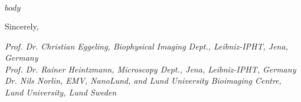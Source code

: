 \documentclass[$size$]{letter}
\newcommand{\header}[9]{
    {\hypersetup{hidelinks}
    \noindent
    \parbox[b][0.625in][t]{6.5in}{
        \vspace{-0.375in}
        \parbox[b][0.625in][t]{3.74in}
            {\href{http://www.umich.edu}
            {\texttt{[image: ./IPHTLogo.pdf]}}}\hfill
        \parbox[b][0.625in][t]{2in}{
            \setlength{\baselineskip}{9pt}
            \fontsize{7pt}{7pt}{
                \fontspec{TeX Gyre Heros}
                #1\\
                #2, #3 #4\\
                Phone: #5\\
                Email: \href{mailto:#6}{#6}
                }
            }
        }}
    }
\begin{document}

\vspace{20pt}

$body$

\begin{minipage}[t]{6.5in}
Sincerely,

\vspace{0.1in}
\textit{Prof. Dr. Christian Eggeling, Biophysical Imaging Dept., Leibniz-IPHT, Jena, Germany}\\
\textit{Prof. Dr. Rainer Heintzmann, Microscopy Dept., Jena, Leibniz-IPHT, Germany}
\textit{Dr. Nils Norlin, EMV, NanoLund, and Lund University Bioimaging Centre, Lund University, Lund Sweden}

\end{minipage}
\end{document}
